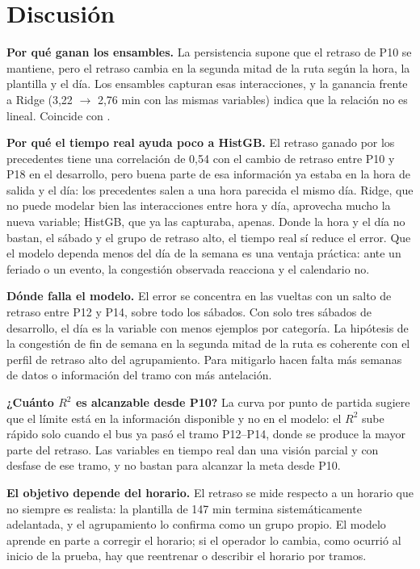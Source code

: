 \documentclass[conference,spanish]{IEEEtran}
\begin{document}
\section{Discusión}

\textbf{Por qué ganan los ensambles.} La persistencia supone que el retraso de P10 se mantiene, pero el retraso cambia en la segunda mitad de la ruta según la hora, la plantilla y el día. Los ensambles capturan esas interacciones, y la ganancia frente a Ridge (3,22 $\to$ 2,76 min con las mismas variables) indica que la relación no es lineal. Coincide con \cite{martyanov2026}.

\textbf{Por qué el tiempo real ayuda poco a HistGB.} El retraso ganado por los precedentes tiene una correlación de 0,54 con el cambio de retraso entre P10 y P18 en el desarrollo, pero buena parte de esa información ya estaba en la hora de salida y el día: los precedentes salen a una hora parecida el mismo día. Ridge, que no puede modelar bien las interacciones entre hora y día, aprovecha mucho la nueva variable; HistGB, que ya las capturaba, apenas. Donde la hora y el día no bastan, el sábado y el grupo de retraso alto, el tiempo real sí reduce el error. Que el modelo dependa menos del día de la semana es una ventaja práctica: ante un feriado o un evento, la congestión observada reacciona y el calendario no.

\textbf{Dónde falla el modelo.} El error se concentra en las vueltas con un salto de retraso entre P12 y P14, sobre todo los sábados. Con solo tres sábados de desarrollo, el día es la variable con menos ejemplos por categoría. La hipótesis de la congestión de fin de semana en la segunda mitad de la ruta es coherente con el perfil de retraso alto del agrupamiento. Para mitigarlo hacen falta más semanas de datos o información del tramo con más antelación.

\textbf{¿Cuánto $R^2$ es alcanzable desde P10?} La curva por punto de partida sugiere que el límite está en la información disponible y no en el modelo: el $R^2$ sube rápido solo cuando el bus ya pasó el tramo P12--P14, donde se produce la mayor parte del retraso. Las variables en tiempo real dan una visión parcial y con desfase de ese tramo, y no bastan para alcanzar la meta desde P10.

\textbf{El objetivo depende del horario.} El retraso se mide respecto a un horario que no siempre es realista: la plantilla de 147 min termina sistemáticamente adelantada, y el agrupamiento lo confirma como un grupo propio. El modelo aprende en parte a corregir el horario; si el operador lo cambia, como ocurrió al inicio de la prueba, hay que reentrenar o describir el horario por tramos.
\end{document}
